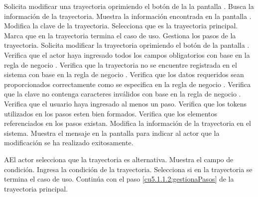  \begin{UCtrayectoria}
	\UCpaso[\UCactor] Solicita modificar una trayectoria oprimiendo el botón \btnEditar de la la pantalla . 
	\UCpaso[\UCsist] Busca la información de la trayectoria.	
	\UCpaso[\UCsist] Muestra la información encontrada en la pantalla .
	\UCpaso[\UCactor] Modifica la clave de la trayectoria.
	\UCpaso[\UCactor] Selecciona que es la trayectoria principal.  \label{cu5.1.1.2:ingresaDatos}
	\UCpaso[\UCsist] Marca que en la trayectoria termina el caso de uso.
	\UCpaso[\UCactor] Gestiona los pasos de la trayectoria. \label{cu5.1.1.2:gestionaPasos}
	\UCpaso[\UCactor] Solicita modificar la trayectoria oprimiendo el botón  de la pantalla .  
	\UCpaso[\UCsist] Verifica que el actor haya ingresado todos los campos obligatorios con base en la regla de negocio . 
	\UCpaso[\UCsist] Verifica que la trayectoria no se encuentre registrada en el sistema con base en la regla de negocio . 
	\UCpaso[\UCsist] Verifica que los datos requeridos sean proporcionados correctamente como se especifica en la regla de negocio .  
	\UCpaso[\UCsist] Verifica que la clave no contenga caracteres inválidos con base en la regla de negocio . 
	\UCpaso[\UCsist] Verifica que el usuario haya ingresado al menos un paso. 
	\UCpaso[\UCsist] Verifica que los tokens utilizados en los pasos esten bien formados. 
	\UCpaso[\UCsist] Verifica que los elementos referenciados en los pasos existan. 
	\UCpaso[\UCsist] Modifica la información de la trayectoria en el sistema.
	\UCpaso[\UCsist] Muestra el mensaje  en la pantalla  
	para indicar al actor que la modificación se ha realizado exitosamente.
    
\end{UCtrayectoria}
 \begin{UCtrayectoriaA}{A}{El actor selecciona que la trayectoria es alternativa.}
    \UCpaso[\UCsist] Muestra el campo de condición.
    \UCpaso[\UCactor] Ingresa la condición de la trayectoria.
    \UCpaso[\UCactor] Selecciona si en la trayectoria se termina el caso de uso.
    \UCpaso[] Continúa con el paso \ref{cu5.1.1.2:gestionaPasos} de la trayectoria principal.
 \end{UCtrayectoriaA}
